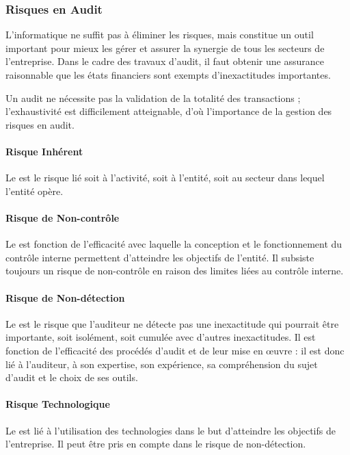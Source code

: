 \subsubsection{Risques en Audit}

L'informatique ne suffit pas à éliminer les risques, mais constitue un outil important
pour mieux les gérer et assurer la synergie de tous les secteurs de l'entreprise. Dans
le cadre des travaux d'audit, il faut obtenir une assurance raisonnable que les états
financiers sont exempts d'inexactitudes importantes.

Un audit ne nécessite pas la validation de la totalité des transactions ; l'exhaustivité
est difficilement atteignable, d'où l'importance de la gestion des risques en audit.

\paragraph{Risque Inhérent}
Le  est le risque lié soit à l'activité, soit à l'entité,
soit au secteur dans lequel l'entité opère.

\paragraph{Risque de Non-contrôle}
Le  est fonction de l'efficacité avec laquelle la
conception et le fonctionnement du contrôle interne permettent d'atteindre les
objectifs de l'entité. Il subsiste toujours un risque de non-contrôle en raison des
limites liées au contrôle interne.

\paragraph{Risque de Non-détection}
Le  est le risque que l'auditeur ne détecte pas une
inexactitude qui pourrait être importante, soit isolément, soit cumulée avec d'autres
inexactitudes. Il est fonction de l'efficacité des procédés d'audit et de leur mise en
œuvre : il est donc lié à l'auditeur, à son expertise, son expérience, sa
compréhension du sujet d'audit et le choix de ses outils.

\paragraph{Risque Technologique}
Le  est lié à l'utilisation des technologies dans le
but d'atteindre les objectifs de l'entreprise. Il peut être pris en compte dans le
risque de non-détection.

